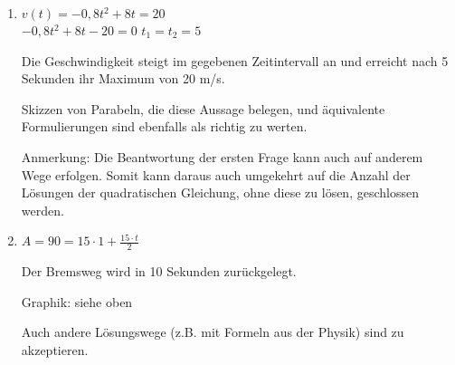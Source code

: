 \begin{langesbeispiel}
{\begin{enumerate}
	Die Beschleunigung 3 Sekunden nach dem Beginn der Bewegung beträgt 3,2\,m/$\text{s}^2$.
	
Anmerkung: Der Zeitpunkt und der Begriff "`Beschleunigung"' müssen angegeben werden.

Die Beschleunigung nimmt pro Sekunde um 1,6\,m/$\text{s}^2$ ab.

Anmerkung: Die Einheit m/$\text{s}^2$ muss angegeben werden.

\item $v(t)=-0,8t^2+8t=20$\\
$-0,8t^2+8t-20=0$ \hspace*{1cm} $t_1=t_2=5$

Die Geschwindigkeit steigt im gegebenen Zeitintervall an und erreicht nach 5 Sekunden ihr Maximum von 20 m/s.

Skizzen von Parabeln, die diese Aussage belegen, und äquivalente Formulierungen sind ebenfalls
als richtig zu werten.

Anmerkung: Die Beantwortung der ersten Frage kann auch auf anderem Wege erfolgen. Somit
kann daraus auch umgekehrt auf die Anzahl der Lösungen der quadratischen Gleichung, ohne diese zu lösen, geschlossen werden.

\item $A=90=15\cdot 1+\frac{15\cdot t}{2}$

Der Bremsweg wird in 10 Sekunden zurückgelegt.

Graphik: siehe oben

Auch andere Lösungswege (z.B. mit Formeln aus der Physik) sind zu akzeptieren.
			\end{enumerate}}
		\end{langesbeispiel}